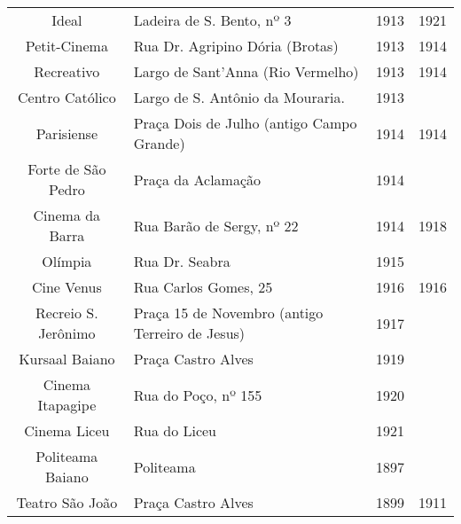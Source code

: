 \begin{table}[!htp]
{\begin{tabular}{cm{6cm}cc}
Ideal & Ladeira de S. Bento, nº 3 & 1913 & 1921 \\
Petit-Cinema & Rua Dr. Agripino Dória (Brotas) & 1913 & 1914 \\
Recreativo & Largo de Sant'Anna (Rio Vermelho) & 1913 & 1914 \\
Centro Católico & Largo de S. Antônio da Mouraria. & 1913 & \\
Parisiense & Praça Dois de Julho (antigo Campo Grande) & 1914 & 1914 \\
Forte de São Pedro & Praça da Aclamação & 1914 &  \\
Cinema da Barra & Rua Barão de Sergy, nº 22 & 1914 & 1918 \\
Olímpia & Rua Dr. Seabra & 1915 & \\
Cine Venus & Rua Carlos Gomes, 25 & 1916 & 1916 \\
Recreio S. Jerônimo & Praça 15 de Novembro (antigo Terreiro de Jesus) & 1917 & \\
Kursaal Baiano & Praça Castro Alves & 1919 &  \\
Cinema Itapagipe & Rua do Poço, nº 155 & 1920 & \\
Cinema Liceu & Rua do Liceu & 1921 & \\
Politeama Baiano & Politeama & 1897 & \\
Teatro São João & Praça Castro Alves & 1899 & 1911 \\
\bottomrule
\end{tabular}
}
{}
\end{table}